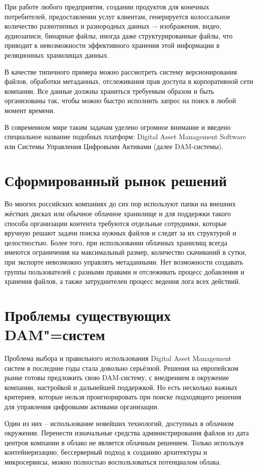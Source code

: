 
При работе любого предприятия, создании продуктов для конечных потребителей, предоставлении услуг клиентам, генерируется колоссальное количество разнотипных и разнородных данных –- изображения, видео, аудиозаписи, бинарные файлы, иногда даже структурированные файлы, что приводит к невозможности эффективного хранения этой информации в реляционных хранилищах данных.

В качестве типичного примера можно рассмотреть систему версионирования файлов, обработки метаданных, отслеживания прав доступа в корпоративной сети компании. Все данные должны храниться требуемым образом и быть организованы так, чтобы можно быстро исполнить запрос на поиск в любой момент времени.

В современном мире таким задачам уделено огромное внимание  и введено специальное название подобных платформ: Digital Asset Management Software или Системы Управления Цифровыми Активами (далее DAM-системы).

\section*{\textbf{Сформированный рынок решений}}
Во многих российских компаниях до сих пор используют папки на внешних жёстких дисках или обычное облачное хранилище и для поддержки такого способа организации контента требуются отдельные сотрудники, которые вручную решают задачи поиска нужных файлов и следят за их структурой и целостностью.
Более того, при использовании облачных хранилищ всегда имеются ограничения на максимальный размер, количество скачиваний в сутки, при экспорте невозможно управлять метаданными. Нет возможности создавать группы пользователей с разными правами и отслеживать процесс добавления и хранения файлов, а также затруднителен процесс ведения лога всех действий.

\section*{Проблемы существующих DAM"=систем}
Проблема выбора и правильного использования Digital Asset Management систем в последние годы стала довольно серьёзной. Решения на европейском рынке готовы предложить свою DAM-систему, с внедрением в окружение компании, настройкой и дальнейшей поддержкой. Но есть несколько важных критериев, которые нельзя проигнорировать при поиске подходящего решения для управления цифровыми активами организации.

Один из них – использование новейших технологий, доступных в облачном окружении. Перенести изначальные средства администрирования файлов из дата центров компании в облако не является облачным решением. Только используя контейнеризацию, бессерверный подход к созданию архитектуры и микросервисы, можно полностью воспользоваться потенциалом облака.

